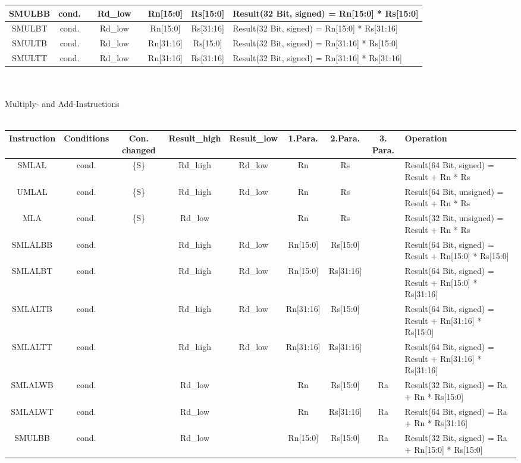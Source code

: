 {\begin{landscape}
\begin{tabular}{|c|c|c|c|c|c|c|l|}
\hline
\hline
SMULBB & cond. &  & Rd\_low &  & Rn[15:0] & Rs[15:0] & Result(32 Bit, signed) = Rn[15:0] * Rs[15:0] \\
\hline
SMULBT & cond. &  & Rd\_low &  & Rn[15:0] & Rs[31:16] & Result(32 Bit, signed) = Rn[15:0] * Rs[31:16] \\
\hline
SMULTB & cond. &  & Rd\_low &  & Rn[31:16] & Rs[15:0] & Result(32 Bit, signed) = Rn[31:16] * Rs[15:0] \\
\hline
SMULTT & cond. &  & Rd\_low &  & Rn[31:16] & Rs[31:16] & Result(32 Bit, signed) = Rn[31:16] * Rs[31:16] \\
\hline
\end{tabular}\\
\\
\newpage
{\rot Multiply- and Add-Instructions}\\
\\
\begin{tabular}{|c|c|c|c|c|c|c|c|l|}
\hline
Instruction & Conditions & Con. changed & Result\_high & Result\_low & 1.Para. & 2.Para. & 3. Para. & Operation\\
\hline
SMLAL & cond. & \{S\} & Rd\_high & Rd\_low & Rn & Rs & & Result(64 Bit, signed) = Result + Rn * Rs \\
\hline
UMLAL & cond. & \{S\} & Rd\_high & Rd\_low & Rn & Rs & & Result(64 Bit, unsigned) = Result + Rn * Rs \\
\hline
MLA & cond. & \{S\} & Rd\_low &  & Rn & Rs & & Result(32 Bit, unsigned) = Result + Rn * Rs \\
\hline
\hline
SMLALBB & cond. &  & Rd\_high & Rd\_low & Rn[15:0] & Rs[15:0] & & Result(64 Bit, signed) = Result + Rn[15:0] * Rs[15:0] \\
\hline
SMLALBT & cond. &  & Rd\_high & Rd\_low & Rn[15:0] & Rs[31:16] & & Result(64 Bit, signed) = Result + Rn[15:0] * Rs[31:16] \\
\hline
SMLALTB & cond. &  & Rd\_high & Rd\_low & Rn[31:16] & Rs[15:0] & & Result(64 Bit, signed) = Result + Rn[31:16] * Rs[15:0] \\
\hline
SMLALTT & cond. &  & Rd\_high & Rd\_low & Rn[31:16] & Rs[31:16] & & Result(64 Bit, signed) = Result + Rn[31:16] * Rs[31:16] \\
\hline
\hline
SMLALWB & cond. &  & Rd\_low &  & Rn & Rs[15:0] & Ra & Result(32 Bit, signed) = Ra + Rn * Rs[15:0] \\
\hline
SMLALWT & cond. &  & Rd\_low &  & Rn & Rs[31:16] & Ra & Result(64 Bit, signed) = Ra + Rn * Rs[31:16] \\
\hline
\hline
SMULBB & cond. &  & Rd\_low &  & Rn[15:0] & Rs[15:0] & Ra & Result(32 Bit, signed) = Ra + Rn[15:0] * Rs[15:0] \\

\end{tabular}
\end{landscape}}

